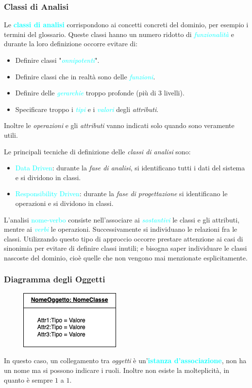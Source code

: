 \subsubsection{Classi di Analisi}
Le \textbf{\textcolor{cyan}{classi di analisi}} corrispondono ai concetti
concreti del dominio, per esempio i termini del glossario. Queste classi hanno un numero
ridotto di \emph{\textcolor{cyan}{funzionalità}} e durante la loro definizione occorre
evitare di:
\begin{itemize}
    \item Definire classi "\emph{\textcolor{cyan}{onnipotenti}}".
    \item Definire classi che in realtà sono delle \emph{\textcolor{cyan}{funzioni}}.
    \item Definire delle \emph{\textcolor{cyan}{gerarchie}} troppo profonde (più di 3 livelli).
    \item Specificare troppo i \emph{\emph{\textcolor{cyan}{tipi}}} e i \emph{\emph{\textcolor{cyan}{valori}}} degli \emph{attributi}.
\end{itemize}
Inoltre le \emph{operazioni} e gli \emph{attributi} vanno indicati solo quando sono veramente utili.

Le principali tecniche di definizione delle \emph{classi di analisi} sono:
\begin{itemize}
    \item \textcolor{cyan}{Data Driven}: durante la \emph{fase di analisi}, si identificano tutti i dati del sistema e si dividono
        in classi.
        \item \textcolor{cyan}{Responsibility Driven}: durante la \emph{fase di progettazione} si identificano le operazioni e si dividono in classi.
\end{itemize}
L'analisi {\textcolor{cyan}{nome-verbo}} consiste nell'associare ai \emph{\textcolor{cyan}{sostantivi}} le classi e gli attributi, mentre ai
\emph{\textcolor{cyan}{verbi}} le operazioni. Successivamente si individuano le relazioni fra le classi. Utilizzando questo
tipo di approccio occorre prestare attenzione ai casi di sinonimia per evitare di definire classi inutili; e bisogna saper individuare
le classi nascoste del dominio, cioè quelle che non vengono mai menzionate esplicitamente.

\newpage
\subsubsection{Diagramma degli Oggetti}
\begin{figure}
    \includegraphics[scale=0.7]{img/diagrammaoggetti.png}
\end{figure}
In questo caso, un collegamento tra \emph{oggetti} è un'\textbf{\textcolor{cyan}{istanza d'associazione}}, non ha un nome
ma si possono indicare i ruoli. Inoltre non esiste la molteplicità, in quanto è sempre $1$ a $1$.
